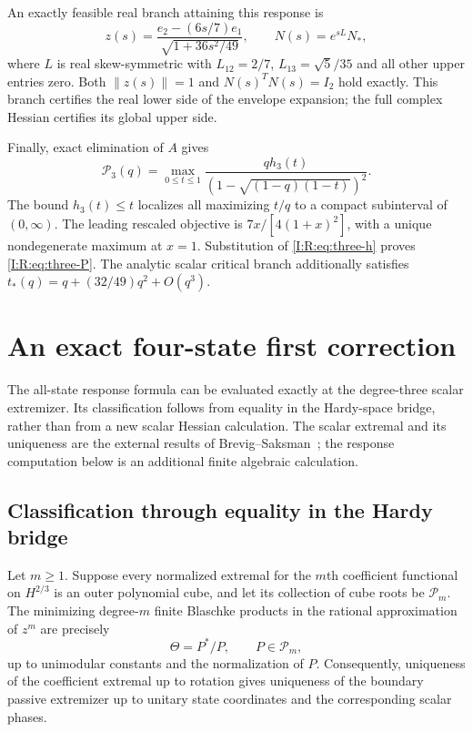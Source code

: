 An exactly feasible real branch attaining this response is
\[
 z(s)=\frac{e_2-(6s/7)e_1}{\sqrt{1+36s^2/49}},\qquad
 N(s)=e^{sL}N_*,
\]
where $L$ is real skew-symmetric with
$L_{12}=2/7$, $L_{13}=\sqrt5/35$ and all other upper entries zero.
Both $\|z(s)\|=1$ and $N(s)^TN(s)=I_2$ hold exactly.
This branch certifies the real lower side of the envelope expansion;
the full complex Hessian certifies its global upper side.

Finally, exact elimination of $A$ gives
\[
 \mathcal P_3(q)=\max_{0\le t\le1}
 \frac{q h_3(t)}{(1-\sqrt{(1-q)(1-t)})^2}.
\]
The bound $h_3(t)\le t$ localizes all maximizing $t/q$ to a compact
subinterval of $(0,\infty)$.  The leading rescaled objective is
$7x/[4(1+x)^2]$, with a unique nondegenerate maximum at $x=1$.
Substitution of \eqref{I:R:eq:three-h} proves \eqref{I:R:eq:three-P}.
The analytic scalar critical branch additionally satisfies
$t_*(q)=q+(32/49)q^2+O(q^3)$.




\section{An exact four-state first correction}
\label{I:R:sec:four-state-correction}

The all-state response formula can be evaluated exactly at the
degree-three scalar extremizer.  Its classification follows from
equality in the Hardy-space bridge, rather than from a new scalar
Hessian calculation.  The scalar extremal and its uniqueness are the
external results of Brevig--Saksman~\cite[Theorem 2]{brevig2020}; the response computation below is
an additional finite algebraic calculation.

\subsection{Classification through equality in the Hardy bridge}

\begin{lemma}
\label{I:R:lem:Hardy-classification-transfer}
Let $m\ge1$.  Suppose every normalized extremal for the $m$th
coefficient functional on $H^{2/3}$ is an outer polynomial cube, and
let its collection of cube roots be $\mathcal P_m$.  The minimizing
degree-$m$ finite Blaschke products in the rational approximation of
$z^m$ are precisely
\[
 \Theta=P^*/P,\qquad P\in\mathcal P_m,
\]
up to unimodular constants and the normalization of $P$.
Consequently, uniqueness of the coefficient extremal up to rotation
gives uniqueness of the boundary passive extremizer up to unitary
state coordinates and the corresponding scalar phases.
\end{lemma}


